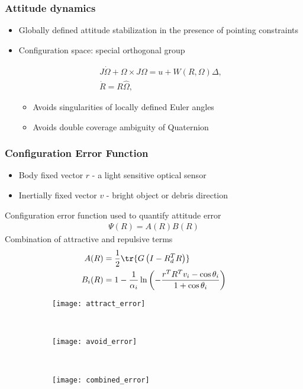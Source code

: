 \documentclass[11pt,professionalfonts]{beamer}
\begin{document}
\begin{frame} %
\frametitle{Attitude dynamics} 
\begin{itemize}
	\item Globally defined attitude stabilization in the presence of pointing constraints
	\item Configuration space: special orthogonal group 

\begin{gather*}
	J\dot\Omega + \Omega\times J\Omega = u+W(R,\Omega)\Delta ,\label{eqn:Wdot}\\
	\dot R = R\hat\Omega ,\label{eqn:Rdot}
\end{gather*}
	\begin{itemize}
		\item Avoids singularities of locally defined Euler angles
		\item Avoids double coverage ambiguity of Quaternion
	\end{itemize}

\end{itemize}

\end{frame}   %


\begin{frame}
\frametitle{Configuration Error Function}
		\begin{itemize}
			\item Body fixed vector \( r \) - a light sensitive optical sensor
			\item Inertially fixed vector \( v \) - bright object or debris direction
		\end{itemize}
		
	Configuration error function used to quantify attitude error
        \begin{align*}
        	\Psi(R) = A(R) B(R) 
        	\label{eq:error_function}
        \end{align*}
	Combination of attractive and repulsive terms   
        \begin{align*}
        	A(R) &= \frac{1}{2} \tr{G \left( I - R_d^T R\right)} \\
        	B_i(R) &= 1 - \frac{1}{\alpha_i} \ln \left( - \frac{ r^T R^T v_i - \cos \theta_i}{1 + \cos \theta_i}\right)
        \end{align*} 


\begin{figure} 
	\centering 	
	\begin{subfigure}[b]{0.3\textwidth} 
		\texttt{[image: attract\_error]}
	\end{subfigure}~
	\begin{subfigure}[b]{0.3\textwidth} 
		\texttt{[image: avoid\_error]}
	\end{subfigure}~
	\begin{subfigure}[b]{0.3\textwidth} 
		\texttt{[image: combined\_error]}
	\end{subfigure}
\end{figure}
\end{frame}
\end{document}
